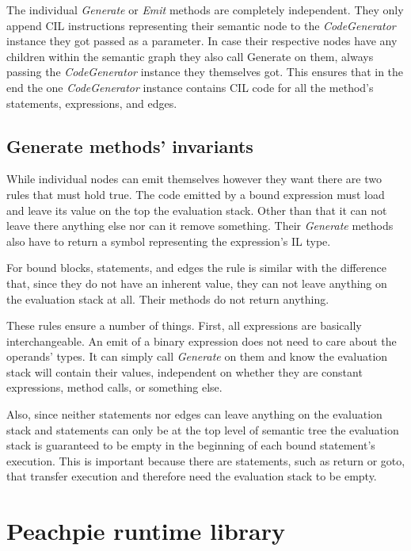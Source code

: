 The individual \emph{Generate} or \emph{Emit} methods are completely independent. They only append CIL instructions representing their semantic node to the \emph{CodeGenerator} instance they got passed as a parameter. In case their respective nodes have any children within the semantic graph they also call Generate on them, always passing the \emph{CodeGenerator} instance they themselves got. This ensures that in the end the one \emph{CodeGenerator} instance contains CIL code for all the method’s statements, expressions, and edges.


\subsection{Generate methods’ invariants}

While individual nodes can emit themselves however they want there are two rules that must hold true. The code emitted by a bound expression must load and leave its value on the top the evaluation stack. Other than that it can not leave there anything else nor can it remove something. Their \emph{Generate} methods also have to return a symbol representing the expression’s IL type. 

For bound blocks, statements, and edges the rule is similar with the difference that, since they do not have an inherent value, they can not leave anything on the evaluation stack at all. Their methods do not return anything.

These rules ensure a number of things. First, all expressions are basically interchangeable. An emit of a binary expression does not need to care about the operands’ types. It can simply call \emph{Generate} on them and know the evaluation stack will contain their values, independent on whether they are constant expressions, method calls, or something else.

Also, since neither statements nor edges can leave anything on the evaluation stack and statements can only be at the top level of semantic tree the evaluation stack is guaranteed to be empty in the beginning of each bound statement’s execution. This is important because there are statements, such as return or goto, that transfer execution and therefore need the evaluation stack to be empty.

\section{Peachpie runtime library}

